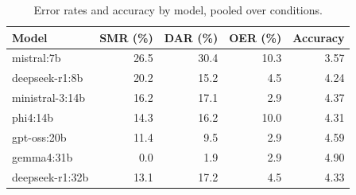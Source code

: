 \begin{table}[H]
\caption{Error rates and accuracy by model, pooled over conditions.}
\label{tab:models}
\centering
\begin{tabular}{lrrrr}
\toprule
Model & SMR (\%) & DAR (\%) & OER (\%) & Accuracy \\
\midrule
mistral:7b & 26.5 & 30.4 & 10.3 & 3.57 \\
deepseek-r1:8b & 20.2 & 15.2 & 4.5 & 4.24 \\
ministral-3:14b & 16.2 & 17.1 & 2.9 & 4.37 \\
phi4:14b & 14.3 & 16.2 & 10.0 & 4.31 \\
gpt-oss:20b & 11.4 & 9.5 & 2.9 & 4.59 \\
gemma4:31b & 0.0 & 1.9 & 2.9 & 4.90 \\
deepseek-r1:32b & 13.1 & 17.2 & 4.5 & 4.33 \\
\bottomrule
\end{tabular}
\end{table}
